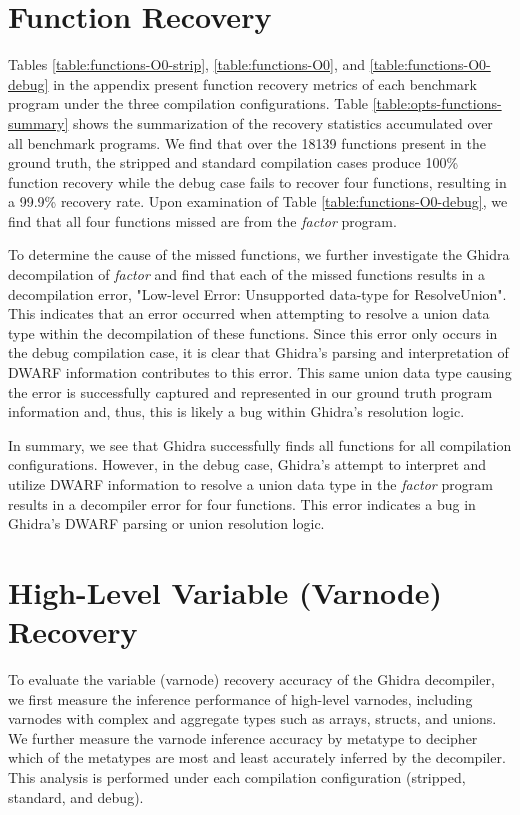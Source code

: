 \section{Function Recovery}



Tables \ref{table:functions-O0-strip}, \ref{table:functions-O0}, and \ref{table:functions-O0-debug} in the appendix present function recovery metrics of each benchmark program under the three compilation configurations. Table \ref{table:opts-functions-summary} shows the summarization of the recovery statistics accumulated over all benchmark programs. We find that over the 18139 functions present in the ground truth, the stripped and standard compilation cases produce 100\% function recovery while the debug case fails to recover four functions, resulting in a 99.9\% recovery rate. Upon examination of Table \ref{table:functions-O0-debug}, we find that all four functions missed are from the \emph{factor} program.

To determine the cause of the missed functions, we further investigate the Ghidra decompilation of \emph{factor} and find that each of the missed functions results in a decompilation error, "Low-level Error: Unsupported data-type for ResolveUnion". This indicates that an error occurred when attempting to resolve a union data type within the decompilation of these functions. Since this error only occurs in the debug compilation case, it is clear that Ghidra's parsing and interpretation of DWARF information contributes to this error. This same union data type causing the error is successfully captured and represented in our ground truth program information and, thus, this is likely a bug within Ghidra's resolution logic.

In summary, we see that Ghidra successfully finds all functions for all compilation configurations. However, in the debug case, Ghidra's attempt to interpret and utilize DWARF information to resolve a union data type in the \emph{factor} program results in a decompiler error for four functions. This error indicates a bug in Ghidra's DWARF parsing or union resolution logic.

\section{High-Level Variable (Varnode) Recovery}

To evaluate the variable (varnode) recovery accuracy of the Ghidra decompiler, we first measure the inference performance of high-level varnodes, including varnodes with complex and aggregate types such as arrays, structs, and unions. We further measure the varnode inference accuracy by metatype to decipher which of the metatypes are most and least accurately inferred by the decompiler. This analysis is performed under each compilation configuration (stripped, standard, and debug).

